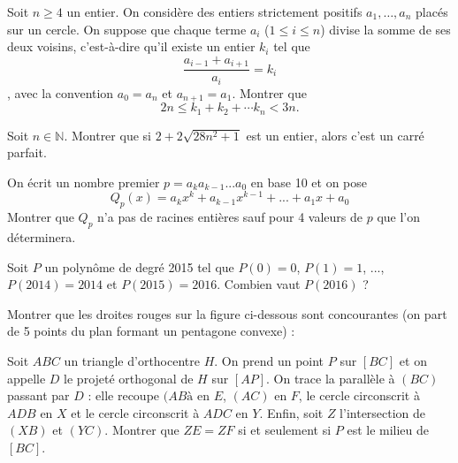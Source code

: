 \begin{exo}{} 
Soit $n \geq 4$ un entier. On considère des entiers strictement positifs $a_{1}, \ldots,a_{n}$ placés sur un cercle. On suppose que chaque terme $a_{i}$ ($1 \leq i \leq n$) divise la somme de ses deux voisins, c'est-à-dire qu'il existe un entier $k_{i}$ tel que 
\[ \frac{a_{i-1}+a_{i+1}}{a_i}= k_i \],
avec la convention $a_{0}=a_{n}$ et $a_{n+1}=a_{1}$. Montrer que
$$2n \leq k_{1}+ k_{2}+ \cdots k_{n} <3n.$$
 \end{exo}

\begin{exo}{}Soit $n \in \mathbb{N}$. Montrer que si $2+2\sqrt{28n^2+1}$ est un entier, alors c'est un carré parfait.
\end{exo}

\begin{exo}{}On écrit un nombre premier $p=a_ka_{k-1}...a_0$ en base 10 et on pose
\[Q_p(x)=a_kx^k+a_{k-1}x^{k-1}+...+a_1x+a_0\]
Montrer que $Q_p$ n'a pas de racines entières sauf pour 4 valeurs de $p$ que l'on déterminera.
\end{exo}

\begin{exo}{}Soit $P$ un polynôme de degré 2015 tel que $P(0)=0$, $P(1)=1$, ..., $P(2014)=2014$ et $P(2015)=2016$. Combien vaut $P(2016)$ ?
\end{exo}




\begin{exo}{}Montrer que les droites rouges sur la figure ci-dessous sont concourantes (on part de 5 points du plan formant un pentagone convexe) :
\end{exo}

\begin{exo}{ }Soit $ABC$ un triangle d'orthocentre $H$. On prend un point $P$ sur $[BC]$ et on appelle $D$ le projeté orthogonal de $H$ sur $[AP]$. On trace la parallèle à $(BC)$ passant par $D$ : elle recoupe $(ABà$ en $E$, $(AC)$ en $F$, le cercle circonscrit à $ADB$ en $X$ et le cercle circonscrit à $ADC$ en $Y$. Enfin, soit $Z$ l'intersection de $(XB)$ et $(YC)$. Montrer que $ZE=ZF$ si et seulement si $P$ est le milieu de $[BC]$.
\end{exo}

